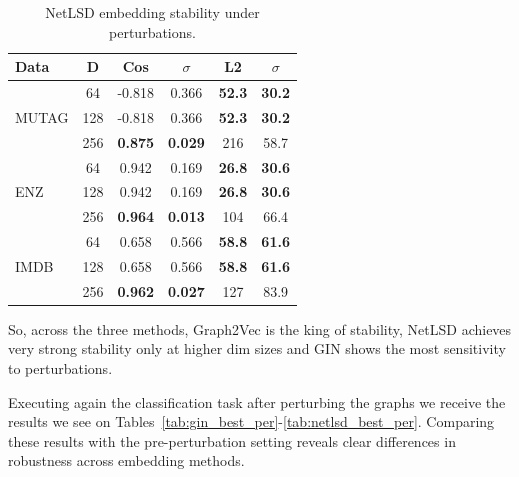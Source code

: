 \begin{table}
\centering
\footnotesize
\setlength{\tabcolsep}{3pt}
\begin{tabular}{l c c c c c}
\hline
\textbf{Data} & \textbf{D} & \textbf{Cos} & \textbf{$\sigma$} & \textbf{L2} & \textbf{$\sigma$} \\
\hline
 & 64  & -0.818 & 0.366 & \textbf{52.3} & \textbf{30.2} \\
MUTAG & 128 & -0.818 & 0.366 & \textbf{52.3} & \textbf{30.2} \\
 & 256 & \textbf{0.875}  & \textbf{0.029} & 216  & 58.7 \\
\hline
   & 64  & 0.942 & 0.169 & \textbf{26.8} & \textbf{30.6} \\
ENZ   & 128 & 0.942 & 0.169 & \textbf{26.8} & \textbf{30.6} \\
   & 256 & \textbf{0.964} & \textbf{0.013} & 104  & 66.4 \\
\hline
 & 64  & 0.658 & 0.566 & \textbf{58.8} & \textbf{61.6} \\
IMDB  & 128 & 0.658 & 0.566 & \textbf{58.8} & \textbf{61.6} \\
  & 256 & \textbf{0.962} & \textbf{0.027} & 127  & 83.9 \\
\hline
\end{tabular}
\caption{NetLSD embedding stability under perturbations.}
\label{tab:stability_netlsd}
\end{table}

So, across the three methods, Graph2Vec is the king of stability,
NetLSD achieves very strong stability only at higher dim sizes
and GIN shows the most sensitivity to perturbations. 

Executing again the classification task after perturbing the graphs we receive
the results we see on Tables~\ref{tab:gin_best_per}-\ref{tab:netlsd_best_per}. 
Comparing these results with the pre-perturbation setting reveals clear differences in robustness across embedding methods.

